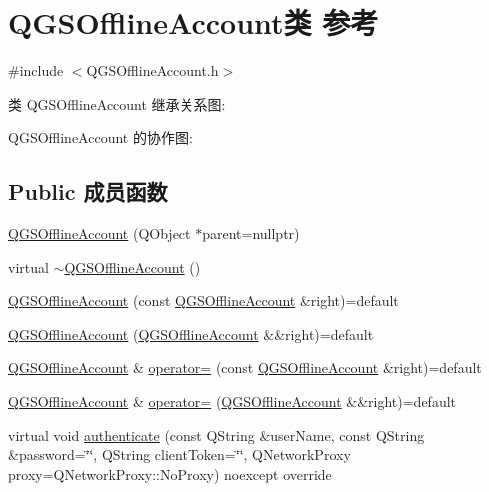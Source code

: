 \hypertarget{class_q_g_s_offline_account}{}\section{Q\+G\+S\+Offline\+Account类 参考}
\label{class_q_g_s_offline_account}


{\ttfamily \#include $<$Q\+G\+S\+Offline\+Account.\+h$>$}



类 Q\+G\+S\+Offline\+Account 继承关系图\+:


Q\+G\+S\+Offline\+Account 的协作图\+:
\subsection*{Public 成员函数}
\begin{DoxyCompactItemize}
\item 
\mbox{\hyperlink{class_q_g_s_offline_account_a0a31833760e00ba38b31238bae465514}{Q\+G\+S\+Offline\+Account}} (Q\+Object $\ast$parent=nullptr)
\item 
virtual \mbox{\hyperlink{class_q_g_s_offline_account_a76299b281cf330bda26c980ea75d1d97}{$\sim$\+Q\+G\+S\+Offline\+Account}} ()
\item 
\mbox{\hyperlink{class_q_g_s_offline_account_a5b15e3bafe217ca99cc594fac744e062}{Q\+G\+S\+Offline\+Account}} (const \mbox{\hyperlink{class_q_g_s_offline_account}{Q\+G\+S\+Offline\+Account}} \&right)=default
\item 
\mbox{\hyperlink{class_q_g_s_offline_account_a51e70fd11cd2acbd406a1a6a825fe9f7}{Q\+G\+S\+Offline\+Account}} (\mbox{\hyperlink{class_q_g_s_offline_account}{Q\+G\+S\+Offline\+Account}} \&\&right)=default
\item 
\mbox{\hyperlink{class_q_g_s_offline_account}{Q\+G\+S\+Offline\+Account}} \& \mbox{\hyperlink{class_q_g_s_offline_account_a8b6b6305d28cef593559775bf78c69a8}{operator=}} (const \mbox{\hyperlink{class_q_g_s_offline_account}{Q\+G\+S\+Offline\+Account}} \&right)=default
\item 
\mbox{\hyperlink{class_q_g_s_offline_account}{Q\+G\+S\+Offline\+Account}} \& \mbox{\hyperlink{class_q_g_s_offline_account_a45d2f3e16b18dc8700fe7afbf494d26f}{operator=}} (\mbox{\hyperlink{class_q_g_s_offline_account}{Q\+G\+S\+Offline\+Account}} \&\&right)=default
\item 
virtual void \mbox{\hyperlink{class_q_g_s_offline_account_af5361c20402584d73ea30a9a75a35bcf}{authenticate}} (const Q\+String \&user\+Name, const Q\+String \&password=\char`\"{}\char`\"{}, Q\+String client\+Token=\char`\"{}\char`\"{}, Q\+Network\+Proxy proxy=Q\+Network\+Proxy\+::\+No\+Proxy) noexcept override
\end{DoxyCompactItemize}
